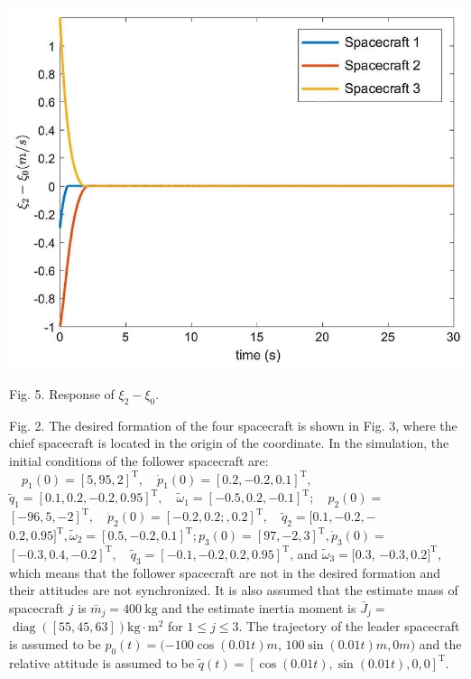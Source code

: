 \documentclass[10pt]{article}
\begin{document}
\begin{center}
\includegraphics[max width=\textwidth]{2023_10_07_a50fd94fd281fe9896c1g-07}
\end{center}

Fig. 5. Response of $\xi_{2}-\xi_{0}$.

Fig. 2. The desired formation of the four spacecraft is shown in Fig. 3, where the chief spacecraft is located in the origin of the coordinate. In the simulation, the initial conditions of the follower spacecraft are: $\quad p_{1}(0)=[5,95,2]^{\mathrm{T}}, \quad \dot{p}_{1}(0)=[0.2,-0.2,0.1]^{\mathrm{T}}$, $\tilde{q}_{1}=[0.1,0.2,-0.2,0.95]^{\mathrm{T}}, \quad \tilde{\omega}_{1}=[-0.5,0.2,-0.1]^{\mathrm{T}} ; \quad p_{2}(0)=$ $[-96,5,-2]^{\mathrm{T}}, \quad \dot{p}_{2}(0)=[-0.2,0.2 ;, 0.2]^{\mathrm{T}}, \quad \tilde{q}_{2}=[0.1,-0.2,-$ $0.2,0.95]^{\mathrm{T}}, \tilde{\omega}_{2}=[0.5,-0.2,0.1]^{\mathrm{T}} ; p_{3}(0)=[97,-2,3]^{\mathrm{T}}, \dot{p}_{3}(0)=$ $[-0.3,0.4,-0.2]^{\mathrm{T}}, \quad \tilde{q}_{3}=[-0.1,-0.2,0.2,0.95]^{\mathrm{T}}$, and $\tilde{\omega}_{3}=[0.3$, $-0.3,0.2]^{\mathrm{T}}$, which means that the follower spacecraft are not in the desired formation and their attitudes are not synchronized. It is also assumed that the estimate mass of spacecraft $j$ is $\bar{m}_{j}=400 \mathrm{~kg}$ and the estimate inertia moment is $\bar{J}_{j}=$ $\operatorname{diag}([55,45,63]) \mathrm{kg} \cdot \mathrm{m}^{2}$ for $1 \leq j \leq 3$. The trajectory of the leader spacecraft is assumed to be $p_{0}(t)=(-100 \cos (0.01 t) m$, $100 \sin (0.01 t) m, 0 m)$ and the relative attitude is assumed to be $\tilde{q}(t)=[\cos (0.01 t), \sin (0.01 t), 0,0]^{\mathrm{T}}$.
\end{document}
